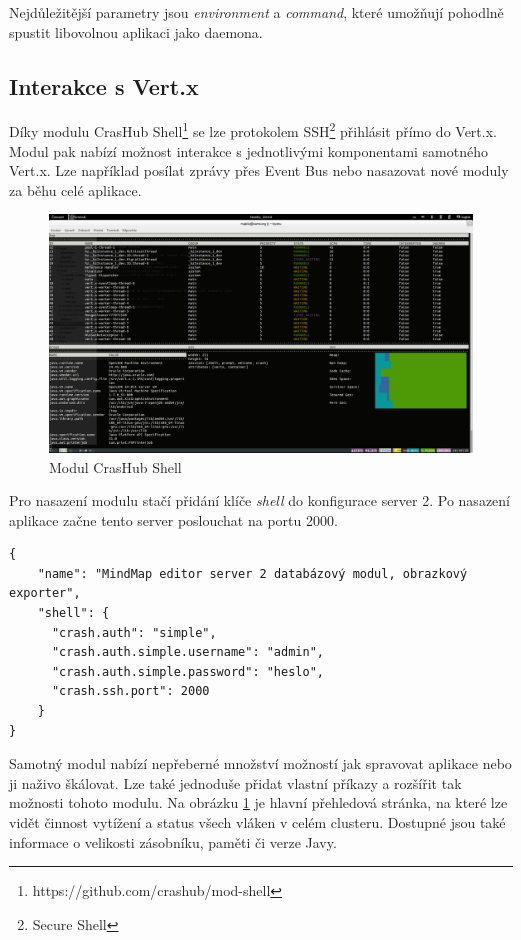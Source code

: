 Nejdůležitější parametry jsou \emph{environment} a \emph{command}, které umožňují pohodlně spustit libovolnou aplikaci jako daemona.

\subsection{Interakce s Vert.x}\label{sub:interaction}

Díky modulu CrasHub Shell\footnote{https://github.com/crashub/mod-shell} se lze protokolem SSH\footnote{Secure Shell} přihlásit přímo do Vert.x. Modul pak nabízí možnost interakce s jednotlivými komponentami samotného Vert.x. Lze například posílat zprávy přes Event Bus nebo nasazovat nové moduly za běhu celé aplikace.
\begin{figure}[h]
\begin{centering}
\includegraphics[scale=0.21]{obrazky/real_interaction}
\par\end{centering}
\caption{Modul CrasHub Shell\label{fig:real_interaction}}
\end{figure}

Pro nasazení modulu stačí přidání klíče \emph{shell} do konfigurace server 2. Po nasazení aplikace začne tento server poslouchat na portu 2000.

\begin{lstlisting}[caption={Konfigurace modulu CrasHub Shell},label=confServ2]
{
    "name": "MindMap editor server 2 databázový modul, obrazkový exporter",
    "shell": {
      "crash.auth": "simple",
      "crash.auth.simple.username": "admin",
      "crash.auth.simple.password": "heslo",
      "crash.ssh.port": 2000
    }
}
\end{lstlisting}

Samotný modul nabízí nepřeberné množství možností jak spravovat aplikace nebo ji naživo škálovat. Lze také jednoduše přidat vlastní příkazy a rozšířit tak možnosti tohoto modulu. Na obrázku \ref{fig:real_interaction} je hlavní přehledová stránka, na které lze vidět činnost vytížení a status všech vláken v celém clusteru. Dostupné jsou také informace o velikosti zásobníku, paměti či verze Javy. 

